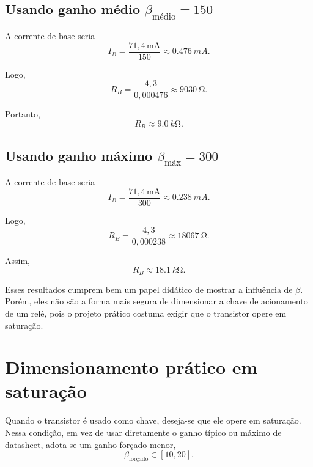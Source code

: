 \documentclass[12pt,a4paper]{article}
\newcommand{\Ib}{I_B}
\newcommand{\Rb}{R_B}
\newcommand{\betaavg}{\beta_{\text{médio}}}
\newcommand{\betamax}{\beta_{\text{máx}}}
\newcommand{\betaf}{\beta_{\text{forçado}}}
\begin{document}
\subsection{Usando ganho médio $\betaavg = 150$}

A corrente de base seria
\begin{equation}
\Ib = \frac{71,4\,\mathrm{mA}}{150}
\approx \SI{0,476}{mA}.
\end{equation}

Logo,
\begin{equation}
\Rb = \frac{4,3}{0,000476}
\approx \SI{9030}{\ohm}.
\end{equation}

Portanto,
\begin{equation}
\boxed{\Rb \approx \SI{9,0}{k\ohm}}.
\end{equation}

\subsection{Usando ganho máximo $\betamax = 300$}

A corrente de base seria
\begin{equation}
\Ib = \frac{71,4\,\mathrm{mA}}{300}
\approx \SI{0,238}{mA}.
\end{equation}

Logo,
\begin{equation}
\Rb = \frac{4,3}{0,000238}
\approx \SI{18067}{\ohm}.
\end{equation}

Assim,
\begin{equation}
\boxed{\Rb \approx \SI{18,1}{k\ohm}}.
\end{equation}

\medskip

\noindent Esses resultados cumprem bem um papel didático de mostrar a influência de $\beta$. Porém, eles não são a forma mais segura de dimensionar a chave de acionamento de um relé, pois o projeto prático costuma exigir que o transistor opere em saturação.

\section{Dimensionamento prático em saturação}

Quando o transistor é usado como chave, deseja-se que ele opere em saturação. Nessa condição, em vez de usar diretamente o ganho típico ou máximo de datasheet, adota-se um ganho forçado menor,
\begin{equation}
\betaf \in [10,20].
\end{equation}
\end{document}
